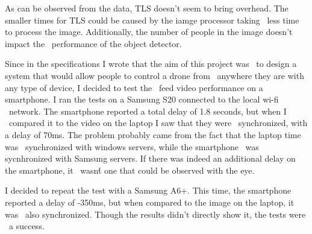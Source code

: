 As can be observed from the data, TLS doesn't seem to bring overhead.
The smaller times for TLS could be caused by the iamge processor taking \
less time to process the image.
Additionally, the number of people in the image doesn't impact the \
performance of the object detector.

Since in the specifications I wrote that the aim of this project was \
to design a system that would allow people to control a drone from \
anywhere they are with any type of device, I decided to test the \
feed video performance on a smartphone.
I ran the tests on a Samsung S20 connected to the local wi-fi \
network.
The smartphone reported a total delay of 1.8 seconds, but when I \
compared it to the video on the laptop I saw that they were \
synchronized, with a delay of 70ms.
The problem probably came from the fact that the laptop time was \
synchronized with windows servers, while the smartphone \
was sycnhronized with Samsung servers.
If there was indeed an additional delay on the smartphone, it \
wasn\'t one that could be observed with the eye.

I decided to repeat the test with a Samsung A6+.
This time, the smartphone reported a delay of -350ms,
but when compared to the image on the laptop, it was \
also synchronized.
Though the results didn't directly show it, the tests were \
a success.
